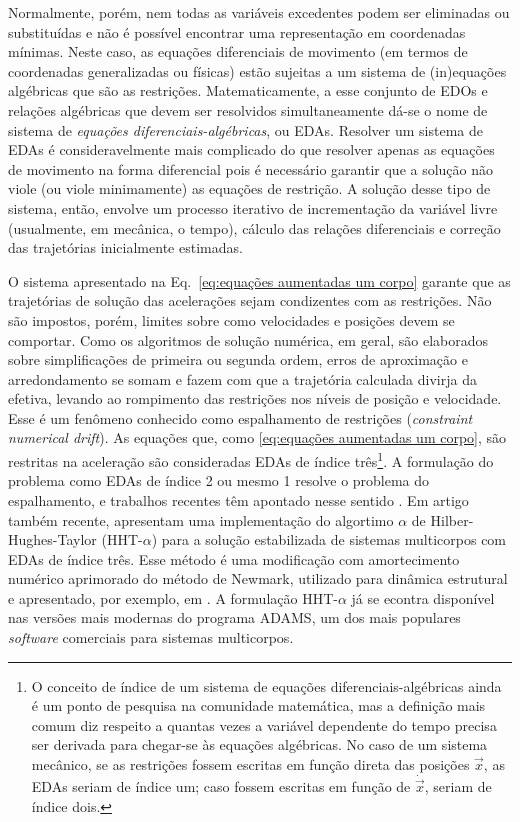 Normalmente, porém, nem todas as variáveis excedentes podem ser eliminadas ou substituídas e não é possível encontrar uma representação em coordenadas mínimas. Neste caso, as equações diferenciais de movimento (em termos de coordenadas generalizadas ou físicas) estão sujeitas a um sistema de (in)equações algébricas que são as restrições. Matematicamente, a esse conjunto de EDOs e relações algébricas que devem ser resolvidos simultaneamente dá-se o nome de sistema de \textit{equações diferenciais-algébricas}, ou EDAs. Resolver um sistema de EDAs é consideravelmente mais complicado do que resolver apenas as equações de movimento na forma diferencial pois é necessário garantir que a solução não viole (ou viole minimamente) as equações de restrição. A solução desse tipo de sistema, então, envolve um processo iterativo de incrementação da variável livre (usualmente, em mecânica, o tempo), cálculo das relações diferenciais e correção das trajetórias inicialmente estimadas.

O sistema apresentado na Eq.~\eqref{eq:equações aumentadas um corpo} garante que as trajetórias de solução das acelerações sejam condizentes com as restrições. Não são impostos, porém, limites sobre como velocidades e posições devem se comportar. Como os algoritmos de solução numérica, em geral, são elaborados sobre simplificações de primeira ou segunda ordem, erros de aproximação e arredondamento se somam e fazem com que a trajetória calculada divirja da efetiva, levando ao rompimento das restrições nos níveis de posição e velocidade. Esse é um fenômeno conhecido como espalhamento de restrições (\textit{constraint numerical drift}). As equações que, como \eqref{eq:equações aumentadas um corpo}, são restritas na aceleração são consideradas EDAs de índice três\footnote{O conceito de índice de um sistema de equações diferenciais-algébricas ainda é um ponto de pesquisa na comunidade matemática, mas a definição mais comum diz respeito a quantas vezes a variável dependente do tempo precisa ser derivada para 
chegar-se às equações algébricas. No caso de um sistema mecânico, se as restrições fossem escritas em função direta das posições $\vec{x}$, as EDAs seriam de índice um; caso fossem escritas em função de $\dot{\vec{x}}$, seriam de índice dois.}. A formulação do problema como EDAs de índice 2 ou mesmo 1 resolve o problema do espalhamento, e trabalhos recentes têm apontado nesse sentido \cite{anitescu_formulating_1997,abe_dynamics_2004}. Em artigo também recente,  apresentam uma implementação do algortimo $\alpha$ de Hilber-Hughes-Taylor (HHT-$\alpha$) para a solução estabilizada de sistemas multicorpos com EDAs de índice três. Esse método é uma modificação com amortecimento numérico aprimorado do método de Newmark, utilizado para dinâmica estrutural e apresentado, por exemplo, em . A formulação HHT-$\alpha$ já se econtra disponível nas versões mais modernas do programa ADAMS, um dos mais populares \textit{software} comerciais para sistemas multicorpos.

